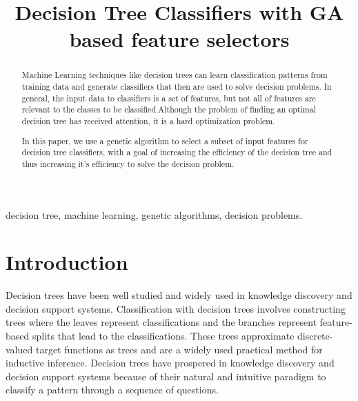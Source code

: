 \documentclass[conference]{IEEEtran}
\begin{document}
\title{Decision Tree Classifiers with GA based feature selectors}


\author{
\and
{}
\and
{}
}




\maketitle


\begin{abstract}
Machine Learning techniques like decision trees can learn classification patterns  from training data and generate classifiers that then are used to solve decision problems. In general, the input data to classifiers is a set of features, but not all of features are relevant
to the classes to be classified.Although the problem of finding an optimal decision tree has received attention, it is a hard  optimization problem.


 In this paper, we use a genetic algorithm to select a subset of input features for decision tree
classifiers, with a goal of increasing the efficiency of the decision tree and thus increasing it’s efficiency to solve the decision problem.
\end{abstract}
\begin{keywords}
decision tree, machine learning, genetic algorithms, decision problems.
\end{keywords}

\IEEEpeerreviewmaketitle



\section{Introduction}
Decision trees have been well studied and widely used in knowledge discovery and decision support systems. Classification with decision trees involves constructing trees where the leaves represent classifications and the branches represent feature-based splits that lead to the classifications. These trees approximate discrete-valued target functions as trees and are a widely used practical method for inductive inference. Decision trees have prospered in knowledge discovery and decision support systems because of their natural and intuitive paradigm to classify a pattern through a sequence of questions. 
\end{document}
